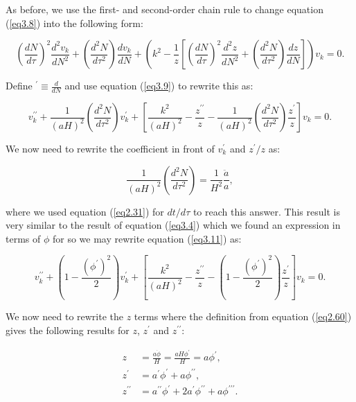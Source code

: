 \documentclass[a4paper,12pt,twoside]{report}
\begin{document}
As before, we use the first- and second-order chain rule to change equation (\ref{eq3.8}) into the following form:

\begin{equation} \label{eq3.10}
\left(\frac{dN}{d\tau}\right)^{2}\frac{d^{2}v_{k}}{dN^{2}} + \left(\frac{d^{2}N}{d\tau^{2}}\right)\frac{dv_{k}}{dN}+\left( k^{2} - \frac{1}{z}\left[\left( \frac{dN}{d\tau} \right)^{2} \frac{d^{2}z}{dN^{2}} + \left( \frac{d^{2}N}{d\tau^{2}} \right) \frac{dz}{dN} \right] \right)v_{k} = 0.
\end{equation}

Define $^{\prime} \equiv \frac{d}{dN}$ and use equation (\ref{eq3.9}) to rewrite this as:

\begin{equation} \label{eq3.11}
v_{k}^{\prime \prime} + \frac{1}{(aH)^{2}}\left(\frac{d^{2}N}{d\tau^{2}}\right)v_{k}^{\prime}+\left[ \frac{k^{2}}{(aH)^{2}} - \frac{z^{\prime \prime}}{z} - \frac{1}{(aH)^{2}} \left( \frac{d^{2}N}{d\tau^{2}} \right) \frac{z^{\prime}}{z} \right]v_{k} = 0.
\end{equation}

We now need to rewrite the coefficient in front of $v_{k}^{\prime}$ and $z^{\prime}/z$ as:

\begin{equation} \label{eq3.12}
\frac{1}{(aH)^{2}}\left(\frac{d^{2}N}{d\tau^{2}}\right) = \frac{1}{H^{2}} \frac{\ddot{a}}{a},
\end{equation}

where we used equation (\ref{eq2.31}) for $dt/d\tau$ to reach this answer. This result is very similar to the result of equation (\ref{eq3.4}) which we found an expression in terms of $\phi$ for so we may rewrite equation (\ref{eq3.11}) as:

\begin{equation}\label{eq3.13}
v_{k}^{\prime \prime} + \left( 1 - \frac{(\phi^{\prime})^{2}}{2} \right)v_{k}^{\prime}+\left[ \frac{k^{2}}{(aH)^{2}} - \frac{z^{\prime \prime}}{z} - \left( 1 - \frac{(\phi^{\prime})^{2}}{2} \right) \frac{z^{\prime}}{z} \right]v_{k} = 0.
\end{equation}

We now need to rewrite the $z$ terms where the definition from equation (\ref{eq2.60}) gives the following results for $z$, $z^{\prime}$ and $z^{\prime \prime}$:

\begin{subequations}
\begin{align}
z &= \frac{a\dot{\phi}}{H} = \frac{aH \phi^{\prime}}{H} = a\phi^{\prime},\label{eq3.14a} \\ 
z^{\prime} &= a^{\prime}\phi^{\prime} + a\phi^{\prime \prime}, \label{eq3.14b} \\ 
z^{\prime \prime} &= a^{\prime \prime}\phi^{\prime} + 2a^{\prime}\phi^{\prime \prime} + a\phi^{\prime \prime \prime}. \label{eq3.14c}
\end{align}
\end{subequations}
\end{document}
